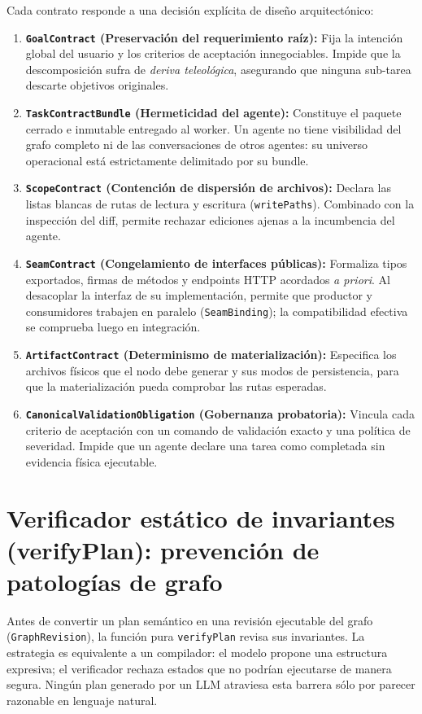 Cada contrato responde a una decisión explícita de diseño arquitectónico:

\begin{enumerate}
  \item \textbf{\texttt{GoalContract} (Preservación del requerimiento raíz):} Fija la intención global del usuario y los criterios de aceptación innegociables. Impide que la descomposición sufra de \emph{deriva teleológica}, asegurando que ninguna sub-tarea descarte objetivos originales.
  \item \textbf{\texttt{TaskContractBundle} (Hermeticidad del agente):} Constituye el paquete cerrado e inmutable entregado al worker. Un agente no tiene visibilidad del grafo completo ni de las conversaciones de otros agentes: su universo operacional está estrictamente delimitado por su bundle.
  \item \textbf{\texttt{ScopeContract} (Contención de dispersión de archivos):} Declara las listas blancas de rutas de lectura y escritura (\texttt{writePaths}). Combinado con la inspección del diff, permite rechazar ediciones ajenas a la incumbencia del agente.
  \item \textbf{\texttt{SeamContract} (Congelamiento de interfaces públicas):} Formaliza tipos exportados, firmas de métodos y endpoints HTTP acordados \emph{a priori}. Al desacoplar la interfaz de su implementación, permite que productor y consumidores trabajen en paralelo (\texttt{SeamBinding}); la compatibilidad efectiva se comprueba luego en integración.
  \item \textbf{\texttt{ArtifactContract} (Determinismo de materialización):} Especifica los archivos físicos que el nodo debe generar y sus modos de persistencia, para que la materialización pueda comprobar las rutas esperadas.
  \item \textbf{\texttt{CanonicalValidationObligation} (Gobernanza probatoria):} Vincula cada criterio de aceptación con un comando de validación exacto y una política de severidad. Impide que un agente declare una tarea como completada sin evidencia física ejecutable.
\end{enumerate}

\section{Verificador estático de invariantes (verifyPlan): prevención de patologías de grafo}
\label{sec:verify-plan}

Antes de convertir un plan semántico en una revisión ejecutable del grafo
(\texttt{GraphRevision}), la función pura \texttt{verifyPlan} revisa sus
invariantes. La estrategia es equivalente a un compilador: el modelo propone
una estructura expresiva; el verificador rechaza estados que no podrían
ejecutarse de manera segura. Ningún plan generado por un LLM atraviesa esta
barrera sólo por parecer razonable en lenguaje natural.

